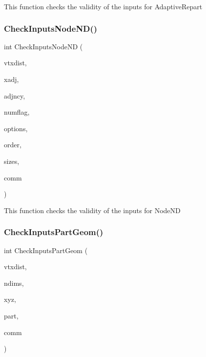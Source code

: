 This function checks the validity of the inputs for Adaptive\+Repart \mbox{\label{a00951_a28bf1e8431cf17c0787be7dc80a565b3}} 
\subsubsection{\texorpdfstring{Check\+Inputs\+Node\+N\+D()}{CheckInputsNodeND()}}
{\footnotesize\ttfamily int Check\+Inputs\+Node\+ND (\begin{DoxyParamCaption}\item[{\hyperlink{a00876_aaa5262be3e700770163401acb0150f52}{idx\+\_\+t} $\ast$}]{vtxdist,  }\item[{\hyperlink{a00876_aaa5262be3e700770163401acb0150f52}{idx\+\_\+t} $\ast$}]{xadj,  }\item[{\hyperlink{a00876_aaa5262be3e700770163401acb0150f52}{idx\+\_\+t} $\ast$}]{adjncy,  }\item[{\hyperlink{a00876_aaa5262be3e700770163401acb0150f52}{idx\+\_\+t} $\ast$}]{numflag,  }\item[{\hyperlink{a00876_aaa5262be3e700770163401acb0150f52}{idx\+\_\+t} $\ast$}]{options,  }\item[{\hyperlink{a00876_aaa5262be3e700770163401acb0150f52}{idx\+\_\+t} $\ast$}]{order,  }\item[{\hyperlink{a00876_aaa5262be3e700770163401acb0150f52}{idx\+\_\+t} $\ast$}]{sizes,  }\item[{M\+P\+I\+\_\+\+Comm $\ast$}]{comm }\end{DoxyParamCaption})}

This function checks the validity of the inputs for Node\+ND \mbox{\label{a00951_a93a8df17e72cf156707aa91218441102}} 
\subsubsection{\texorpdfstring{Check\+Inputs\+Part\+Geom()}{CheckInputsPartGeom()}}
{\footnotesize\ttfamily int Check\+Inputs\+Part\+Geom (\begin{DoxyParamCaption}\item[{\hyperlink{a00876_aaa5262be3e700770163401acb0150f52}{idx\+\_\+t} $\ast$}]{vtxdist,  }\item[{\hyperlink{a00876_aaa5262be3e700770163401acb0150f52}{idx\+\_\+t} $\ast$}]{ndims,  }\item[{\hyperlink{a00876_a1924a4f6907cc3833213aba1f07fcbe9}{real\+\_\+t} $\ast$}]{xyz,  }\item[{\hyperlink{a00876_aaa5262be3e700770163401acb0150f52}{idx\+\_\+t} $\ast$}]{part,  }\item[{M\+P\+I\+\_\+\+Comm $\ast$}]{comm }\end{DoxyParamCaption})}

